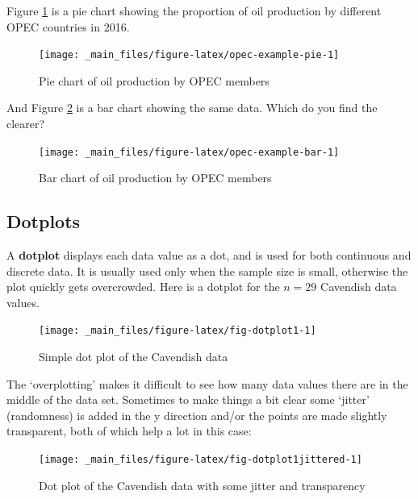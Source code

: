 \documentclass[
]{book}
\begin{document}
Figure \ref{fig:opec-example-pie} is a pie chart showing the proportion of oil production by different
OPEC countries in 2016.

\begin{figure}

{\centering \texttt{[image: \_main\_files/figure-latex/opec-example-pie-1]} 

}

\caption{Pie chart of oil production by OPEC members}\label{fig:opec-example-pie}
\end{figure}

And Figure \ref{fig:opec-example-bar} is a bar chart showing the same data. Which do you find the clearer?

\begin{figure}

{\centering \texttt{[image: \_main\_files/figure-latex/opec-example-bar-1]} 

}

\caption{Bar chart of oil production by OPEC members}\label{fig:opec-example-bar}
\end{figure}

\hypertarget{visual_plot_dot}{%
\subsection{\texorpdfstring{{\textbf{Dotplots}}}{Dotplots}}\label{visual_plot_dot}}

A \textbf{dotplot} displays each data value as a dot, and is used for both continuous and discrete data. It is usually used only
when the sample size is small, otherwise the plot quickly gets overcrowded.
Here is a dotplot for the \(n=29\) Cavendish data values.

\begin{figure}

{\centering \texttt{[image: \_main\_files/figure-latex/fig-dotplot1-1]} 

}

\caption{Simple dot plot of the Cavendish data}\label{fig:fig-dotplot1}
\end{figure}

The `overplotting' makes it
difficult to see how many data values there are in the middle of the data set. Sometimes to make things a bit clear some `jitter' (randomness) is added in the y direction and/or the points are made slightly transparent, both of which help a lot in this case:

\begin{figure}

{\centering \texttt{[image: \_main\_files/figure-latex/fig-dotplot1jittered-1]} 

}

\caption{Dot plot of the Cavendish data with some jitter and transparency}\label{fig:fig-dotplot1jittered}
\end{figure}
\end{document}
